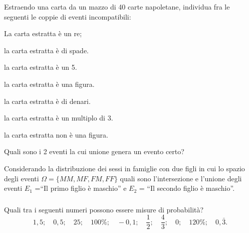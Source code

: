 \begin{esercizio}
 \label{ese:9.4}
Estraendo una carta da un mazzo di 40 carte napoletane, individua fra le 
seguenti le coppie di eventi incompatibili:
\begin{multicols}{2}
\begin{enumeratea}
\item La carta estratta è un re;
\item la carta estratta è di spade.
\item la carta estratta è un 5.
\item la carta estratta è una figura.
\item la carta estratta è di denari.
\item la carta estratta è un multiplo di 3.
\item la carta estratta non è una figura.
\end{enumeratea}
\end{multicols}
Quali sono i 2 eventi la cui unione genera un evento certo?
\end{esercizio}

\begin{esercizio}
 \label{ese:9.5}
 Considerando la distribuzione dei sessi in famiglie con due figli in cui lo 
spazio degli eventi $\Omega =\{{MM}, {MF}, {FM}, {FF}\}$ quali sono 
l'intersezione e l'unione degli eventi $E_1$ =``Il primo figlio è maschio'' e 
$E_2$ = ``Il secondo figlio è maschio''.
\end{esercizio}

\subsubsection*{}

\begin{esercizio}
 \label{ese:9.6}
Quali tra i seguenti numeri possono essere misure di probabilità? 
\[1,5;\quad 0,5;\quad 25;\quad 100\%;\quad -0,1;\quad \frac 1 2;\quad 
\frac 4 3;\quad 0;\quad 120\%;\quad 0,\bar 3. \]
\end{esercizio}


